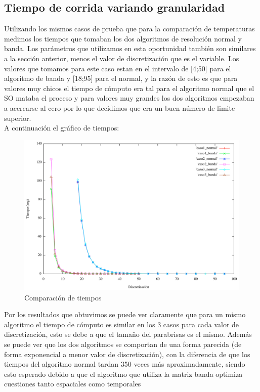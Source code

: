 \subsection{Tiempo de corrida variando granularidad}
Utilizando los mismos casos de prueba que para la comparación de temperaturas medimos los tiempos que tomaban los dos algoritmos de resolución normal y banda. Los parámetros que utilizamos en esta oportunidad también son similares a la sección anterior, menos el valor de discretización que es el variable. Los valores que tomamos para este caso estan en el intervalo de [4;50] para el algoritmo de banda y [18;95] para el normal, y la razón de esto es que para valores muy chicos el tiempo de cómputo era tal para el algoritmo normal que el SO mataba el proceso y para valores muy grandes los dos algoritmos empezaban a acercarse al cero por lo que decidimos que era un buen número de limite superior. \\
A continuación el gráfico de tiempos:
\begin{figure}[htb]
\begin{center}
        \includegraphics[scale=0.5]{imagenes/comparacion_tiempos.png}
                \caption{Comparación de tiempos}
        \end{center}

\end{figure}

Por los resultados que obtuvimos se puede ver claramente que para un mismo algoritmo el tiempo de cómputo es similar en los 3 casos para cada valor de discretización, esto se debe a que el tamaño del parabrisas es el mismo. Además se puede ver que los dos algoritmos se comportan de una forma parecida (de forma exponencial a menor valor de discretización), con la diferencia de que los tiempos del algoritmo normal tardan 350 veces más aproximadamente, siendo esto esperado debido a que el algoritmo que utiliza la matriz banda optimiza cuestiones tanto espaciales como temporales

